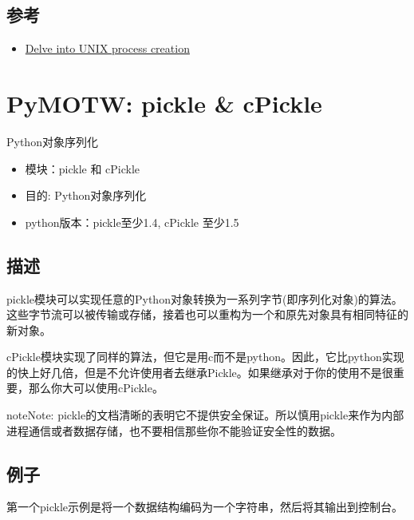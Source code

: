 \documentclass[letterpaper,10pt,english]{manual}
\begin{document}
\subsection{参考}
\begin{itemize}
\item {} 
\href{http://www.ibm.com/developerworks/aix/library/au-unixprocess.html}{Delve into UNIX process creation}

\end{itemize}

\resetcurrentobjects


\section{PyMOTW: pickle \& cPickle}

Python对象序列化
\begin{itemize}
\item {} 
模块：pickle 和 cPickle

\item {} 
目的: Python对象序列化

\item {} 
python版本：pickle至少1.4, cPickle 至少1.5

\end{itemize}


\subsection{描述}

pickle模块可以实现任意的Python对象转换为一系列字节(即序列化对象)的算法。这些字节流可以被传输或存储，接着也可以重构为一个和原先对象具有相同特征的新对象。

cPickle模块实现了同样的算法，但它是用c而不是python。因此，它比python实现的快上好几倍，但是不允许使用者去继承Pickle。如果继承对于你的使用不是很重要，那么你大可以使用cPickle。

\begin{notice}{note}{Note:}
pickle的文档清晰的表明它不提供安全保证。所以慎用pickle来作为内部进程通信或者数据存储，也不要相信那些你不能验证安全性的数据。
\end{notice}


\subsection{例子}

第一个pickle示例是将一个数据结构编码为一个字符串，然后将其输出到控制台。
\end{document}

